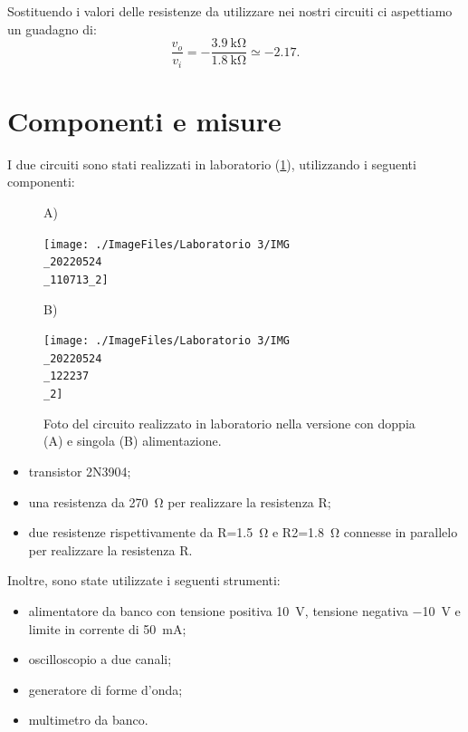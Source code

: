 Sostituendo i valori delle resistenze da utilizzare nei nostri circuiti ci aspettiamo un guadagno di:
\begin{equation}
	\frac{v_o}{v_i}=-\frac{\SI{3.9}{\kilo\ohm}}{\SI{1.8}{\kilo\ohm}}\simeq -2.17.
\end{equation}

\section{Componenti e misure}
I due circuiti sono stati realizzati in laboratorio (\Fig\ref{fig:commonemitter_circuito}), utilizzando i seguenti componenti:
\begin{figure}[h!]
	\centering
	A)
	
	\texttt{[image: ./ImageFiles/Laboratorio 3/IMG\\\_20220524\\\_110713\_2]}
	
	B)
	
	\texttt{[image: ./ImageFiles/Laboratorio 3/IMG\\\_20220524\\\_122237\\\_2]}
	\caption{Foto del circuito realizzato in laboratorio nella versione con doppia (A) e singola (B) alimentazione.}
	\label{fig:commonemitter_circuito}
\end{figure}

\begin{itemize}
	\item transistor 2N3904;
	\item una resistenza da \SI{270}{\ohm} per realizzare la resistenza R;
	\item due resistenze rispettivamente da R=\SI{1.5}{\ohm} e R2=\SI{1.8}{\ohm} connesse in parallelo per realizzare la resistenza R.
\end{itemize}
Inoltre, sono state utilizzate i seguenti strumenti:
\begin{itemize}
	\item alimentatore da banco con tensione positiva \SI{10}{\volt}, tensione negativa \SI{-10}{\volt} e limite in corrente di \SI{50}{\milli\ampere};
	\item oscilloscopio a due canali;
	\item generatore di forme d'onda;
	\item multimetro da banco.
\end{itemize}
